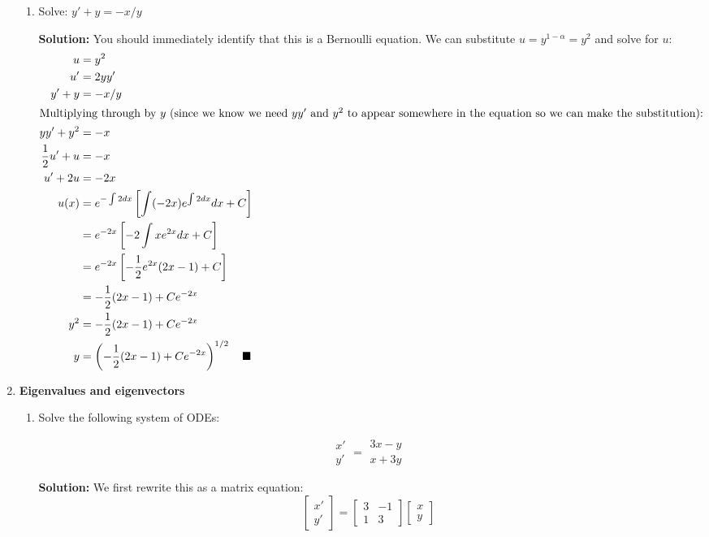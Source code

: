 \documentclass[letterpaper, fontsize=12pt]{scrartcl} %
\numberwithin{equation}{section} %
\numberwithin{figure}{section} %
\numberwithin{table}{section} %
\begin{document}
\begin{enumerate}
\begin{enumerate}[label = (\alph*)]
\item Solve: $y' + y = -x/y$

\par \textbf{Solution:} You should immediately identify that this is a Bernoulli equation. We can substitute $u = y^{1 - \alpha} = y^2$ and solve for $u$:
\begin{align*}
u& = y^2\\
u' &= 2yy' \\
y' + y &=  -x/y\\
\intertext{Multiplying through by $y$ (since we know we need $yy'$ and $y^2$ to appear somewhere in the equation so we can make the substitution):}
yy' + y^2 &= -x\\
\frac{1}{2} u' + u &= -x \\
u' + 2u &= -2x \\
u(x) &= e^{-\int 2dx} \left[ \int (-2x) e^{\int 2dx} dx + C\right]\\
&= e^{-2x} \left[ -2 \int xe^{2x} dx + C\right] \\
&= e^{-2x} \left[ -\frac{1}{2}e^{2x}(2x - 1) + C \right] \\
&= -\frac{1}{2}(2x - 1) + Ce^{-2x} \\
y^2 &= -\frac{1}{2}(2x - 1) + Ce^{-2x}  \\
y &= \left(-\frac{1}{2}(2x - 1) + Ce^{-2x} \right)^{1/2} \quad\blacksquare
\end{align*}


\end{enumerate}

\item \textbf{Eigenvalues and eigenvectors}
\begin{enumerate}[label = (\alph*)]
\item Solve the following system of ODEs: 

\[ \begin{matrix} x' \\ y' \end{matrix} = \begin{matrix} 3x -y \\x + 3y \end{matrix} \]

\par \textbf{Solution:} We first rewrite this as a matrix equation:
\[ \begin{bmatrix} x' \\ y' \end{bmatrix} = \begin{bmatrix} 3 & -1 \\ 1 & 3 \end{bmatrix} \begin{bmatrix} x \\ y \end{bmatrix} \]


\end{enumerate}
\end{enumerate}
\end{document}

